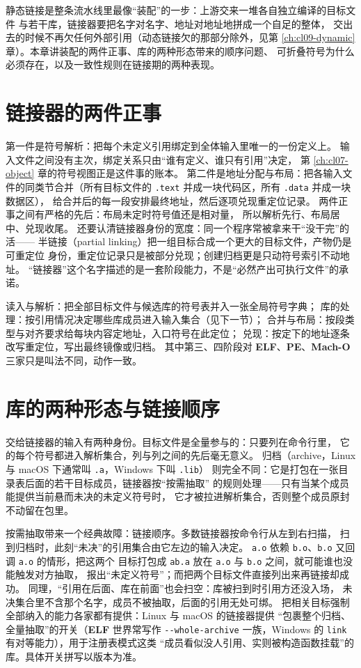 \documentclass[12pt,a4paper,fontset=fandol]{ctexbook}
\newcommand{\Tp}[1]{\texttt{#1}}
\newcommand{\Opt}[1]{\texttt{-\/-#1}}
\newcommand{\Tool}[1]{\texttt{#1}}
\newcommand{\Sect}[1]{\texttt{.#1}}
\newcommand{\Elf}{\textbf{\textsf{ELF}}}
\newcommand{\PeFmt}{\textbf{\textsf{PE}}}
\newcommand{\Macho}{\textbf{\textsf{Mach-O}}}
\newcommand{\Nix}{\textsf{Linux}}
\newcommand{\Win}{\textsf{Windows}}
\newcommand{\Mac}{\textsf{macOS}}
\begin{document}
静态链接是整条流水线里最像“装配”的一步：上游交来一堆各自独立编译的目标文件
与若干库，链接器要把名字对名字、地址对地址地拼成一个自足的整体，
交出去的时候不再欠任何外部引用（动态链接欠的那部分除外，见第
\ref{ch:cl09-dynamic} 章）。本章讲装配的两件正事、库的两种形态带来的顺序问题、
可折叠符号为什么必须存在，以及一致性规则在链接期的两种表现。

\section{链接器的两件正事}\label{sec:cl08-two-jobs}

第一件是符号解析：把每个未定义引用绑定到全体输入里唯一的一份定义上。
输入文件之间没有主次，绑定关系只由“谁有定义、谁只有引用”决定，
第 \ref{ch:cl07-object} 章的符号视图正是这件事的账本。
第二件是地址分配与布局：把各输入文件的同类节合并（所有目标文件的
\Sect{text} 并成一块代码区，所有 \Sect{data} 并成一块数据区），
给合并后的每一段安排最终地址，然后逐项兑现重定位记录。
两件正事之间有严格的先后：布局未定时符号值还是相对量，
所以解析先行、布局居中、兑现收尾。
还要认清链接器身份的宽度：同一个程序常被拿来干“没干完”的活——
半链接（partial linking）把一组目标合成一个更大的目标文件，产物仍是可重定位
身份，重定位记录只是被部分兑现；创建归档更是只动符号索引不动地址。
“链接器”这个名字描述的是一套阶段能力，不是“必然产出可执行文件”的承诺。

\begin{flow}[title={静态链接内部的四个阶段}]
读入与解析：把全部目标文件与候选库的符号表并入一张全局符号字典；
库的处理：按引用情况决定哪些库成员进入输入集合（见下一节）；
合并与布局：按段类型与对齐要求给每块内容定地址，入口符号在此定位；
兑现：按定下的地址逐条改写重定位，写出最终镜像或归档。
其中第三、四阶段对 \Elf、\PeFmt、\Macho 三家只是叫法不同，动作一致。
\end{flow}

\section{库的两种形态与链接顺序}\label{sec:cl08-archives}

交给链接器的输入有两种身份。目标文件是全量参与的：只要列在命令行里，
它的每个符号都进入解析集合，列与列之间的先后毫无意义。
归档（archive，\Nix{} 与 \Mac{} 下通常叫 \Tp{.a}，\Win{} 下叫 \Tp{.lib}）
则完全不同：它是打包在一张目录表后面的若干目标成员，链接器按“按需抽取”
的规则处理——只有当某个成员能提供当前悬而未决的未定义符号时，
它才被拉进解析集合，否则整个成员原封不动留在包里。

按需抽取带来一个经典故障：链接顺序。多数链接器按命令行从左到右扫描，
扫到归档时，此刻“未决”的引用集合由它左边的输入决定。
\Tp{a.o} 依赖 \Tp{b.o}、\Tp{b.o} 又回调 \Tp{a.o} 的情形，把这两个
目标打包成 \Tp{ab.a} 放在 \Tp{a.o} 与 \Tp{b.o} 之间，就可能谁也没能触发对方抽取，
报出“未定义符号”；而把两个目标文件直接列出来再链接却成功。
同理，“引用在后面、库在前面”也会扫空：库被扫到时引用方还没入场，
未决集合里不含那个名字，成员不被抽取，后面的引用无处可绑。
把相关目标强制全部纳入的能力各家都有提供：\Nix{} 与 \Mac{} 的链接器提供
“包裹整个归档、全量抽取”的开关（\Elf{} 世界常写作 \Opt{whole-archive}
一族，\Win{} 的 \Tool{link} 有对等能力），用于注册表模式这类
“成员看似没人引用、实则被构造函数挂载”的库。具体开关拼写以版本为准。
\end{document}
